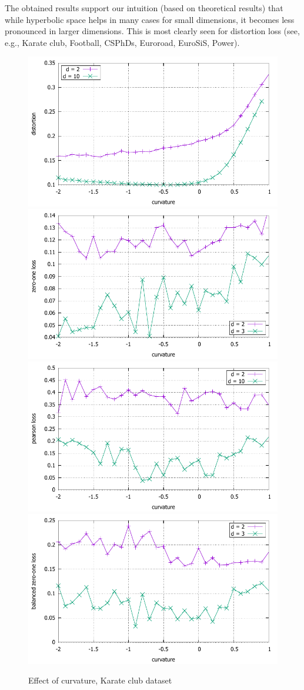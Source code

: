 \documentclass{article} %
\begin{document}
The obtained results support our intuition (based on theoretical results) that while hyperbolic space helps in many cases for small dimensions, it becomes less pronounced in larger dimensions. This is most clearly seen for distortion loss (see, e.g., Karate club, Football, CSPhDs, Euroroad, EuroSiS, Power).

\begin{figure}
    \centering
    \includegraphics[width = 0.49 \textwidth]{karate_distortion.pdf}
    \includegraphics[width = 0.49 \textwidth]{karate_zero_one.pdf}
    \includegraphics[width = 0.49 \textwidth]{karate_pearson.pdf}
    \includegraphics[width = 0.49 \textwidth]{karate_balanced_zero_one.pdf}
    \caption{Effect of curvature, Karate club dataset}
    \label{fig:karate}
\end{figure}
\end{document}
